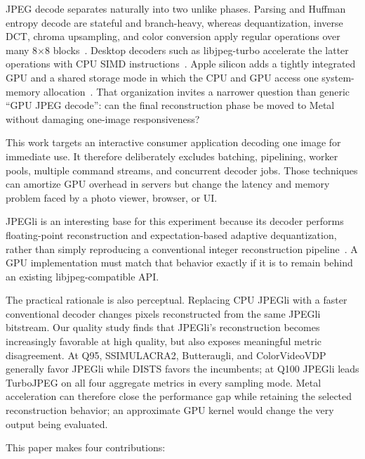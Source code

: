 \documentclass[10pt,twocolumn]{article}
\begin{document}
JPEG decode separates naturally into two unlike phases.  Parsing and Huffman
entropy decode are stateful and branch-heavy, whereas dequantization, inverse
DCT, chroma upsampling, and color conversion apply regular operations over
many 8$\times$8 blocks~\cite{wallace1992jpeg}.  Desktop decoders such as
libjpeg-turbo accelerate the latter operations with CPU SIMD
instructions~\cite{libjpegturbo}.  Apple silicon adds a tightly integrated GPU
and a shared storage mode in which the CPU and GPU access one system-memory
allocation~\cite{apple-shared-storage}.  That organization invites a narrower
question than generic ``GPU JPEG decode'': can the final reconstruction phase
be moved to Metal without damaging one-image responsiveness?

This work targets an interactive consumer application decoding one image for
immediate use.  It therefore deliberately excludes batching, pipelining,
worker pools, multiple command streams, and concurrent decoder jobs.  Those
techniques can amortize GPU overhead in servers but change the latency and
memory problem faced by a photo viewer, browser, or UI.

JPEGli is an interesting base for this experiment because its decoder performs
floating-point reconstruction and expectation-based adaptive dequantization,
rather than simply reproducing a conventional integer reconstruction
pipeline~\cite{jpegli}.  A GPU implementation must match that behavior exactly
if it is to remain behind an existing libjpeg-compatible API.

The practical rationale is also perceptual.  Replacing CPU JPEGli with a
faster conventional decoder changes pixels reconstructed from the same JPEGli
bitstream.  Our quality study finds that JPEGli's reconstruction becomes
increasingly favorable at high quality, but also exposes meaningful metric
disagreement.  At Q95, SSIMULACRA2, Butteraugli, and ColorVideoVDP generally
favor JPEGli while DISTS favors the incumbents; at Q100 JPEGli leads
TurboJPEG on all four aggregate metrics in every sampling mode.  Metal
acceleration can therefore close the performance gap while retaining the
selected reconstruction behavior; an approximate GPU kernel would change the
very output being evaluated.

This paper makes four contributions:
\end{document}
